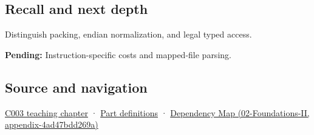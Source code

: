 \subsection{Recall and next depth}\label{recall-and-next-depth}

Distinguish packing, endian normalization, and legal typed access.

\textbf{Pending:} Instruction-specific costs and mapped-file parsing.

\subsection{Source and navigation}\label{source-and-navigation}

\href{Continuous\%20Notes/Computing\%20Foundations\%20-\%20From\%20Bits\%20to\%20C++\%20and\%20Systems\%20APIs\#Where\%20the\%20bytes\%20live}{C003 teaching chapter} · \hyperref[appendix-fd090d982a15]{Part definitions} · \href{}{Dependency Map (02-Foundations-II, appendix-4ad47bdd269a)}
